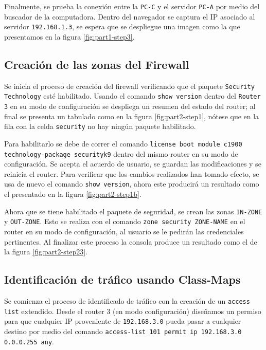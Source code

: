 \documentclass[11pt]{article}
\begin{document}
            Finalmente, se prueba la conexión entre la \texttt{PC-C} y el servidor \texttt{PC-A} por medio del buscador de la computadora. Dentro del navegador se captura el IP asociado al servidor \texttt{192.168.1.3}, se espera que se despliegue una imagen como la que presentamos en la figura \ref{fig:part1-step3}.

        \subsection{Creación de las zonas del Firewall}

            Se inicia el proceso de creación del firewall verificando que el paquete \texttt{Security Technology} esté habilitado. Usando el comando \texttt{show version} dentro del \texttt{Router 3} en su modo de configuración se despliega un resumen del estado del router; al final se presenta un tabulado como en la figura \ref{fig:part2-step1}, nótese que en la fila con la celda \texttt{security} no hay ningún paquete habilitado.

            Para habilitarlo se debe de correr el comando \texttt{license boot module c1900 technology-package securityk9} dentro del mismo router en su modo de configuración. Se acepta el acuerdo de usuario, se guardan las modificaciones y se reinicia el router. Para verificar que los cambios realizados han tomado efecto, se usa de nuevo el comando \texttt{show version}, ahora este producirá un resultado como el presentado en la figura \ref{fig:part2-step1b}.

            Ahora que se tiene habilitado el paquete de seguridad, se crean las zonas \texttt{IN-ZONE} y \texttt{OUT-ZONE}. Esto se realiza con el comando \texttt{zone security ZONE-NAME} en el router en su modo de configuración, al usuario se le pedirán las credenciales pertinentes. Al finalizar este proceso la consola produce un resultado como el de la figura \ref{fig:part2-step23}.

        \subsection{Identificación de tráfico usando Class-Maps}

            Se comienza el proceso de identificado de tráfico con la creación de un \texttt{access list} extendido. Desde el router 3 (en modo configuración) diseñamos un permiso para que cualquier IP proveniente de \texttt{192.168.3.0} pueda pasar a cualquier destino por medio del comando \texttt{access-list 101 permit ip 192.168.3.0 0.0.0.255 any}.
\end{document}
